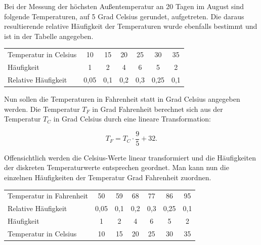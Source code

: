 \begin{beispiel}
Bei der Messung der höchsten Außentemperatur an 20 Tagen im August sind folgende Temperaturen, auf 5 Grad Celsius gerundet, aufgetreten. Die daraus resultierende relative Häufigkeit der Temperaturen wurde ebenfalls bestimmt und ist in der Tabelle angegeben.

\begin{center}
\begin{tabular}{l|cccccc}
  \hline
  Temperatur in Celsius & 10 & 15 & 20 & 25 & 30 & 35 \\
  Häufigkeit & 1 & 2 & 4 & 6 & 5 & 2 \\
  Relative Häufigkeit & 0{,}05 & 0{,}1 & 0{,}2 & 0{,}3 & 0{,}25 & 0{,}1 \\
  \hline
\end{tabular}
\end{center}

Nun sollen die Temperaturen in Fahrenheit statt in Grad Celsius angegeben werden. Die Temperatur $T_F$ in Grad Fahrenheit berechnet sich aus der Temperatur $T_C$ in Grad Celsius durch eine lineare Transformation:

$$
T_F = T_C \cdot \frac{9}{5} + 32.
$$

Offensichtlich werden die Celsius-Werte linear transformiert und die Häufigkeiten der diskreten Temperaturwerte entsprechen geordnet. Man kann nun die einzelnen Häufigkeiten der Temperatur Grad Fahrenheit zuordnen.

\begin{center}
\begin{tabular}{l|cccccc}
  \hline
  Temperatur in Fahrenheit & 50 & 59 & 68 & 77 & 86 & 95 \\
  Relative Häufigkeit & 0{,}05 & 0{,}1 & 0{,}2 & 0{,}3 & 0{,}25 & 0{,}1 \\
  Häufigkeit & 1 & 2 & 4 & 6 & 5 & 2 \\
  Temperatur in Celsius & 10 & 15 & 20 & 25 & 30 & 35 \\
  \hline
\end{tabular}
\end{center}
\end{beispiel}

